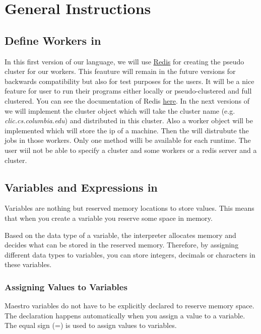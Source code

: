 \section{General Instructions}
\label{sect:general}

\subsection*{Define Workers in \lang{}}
In this first version of our \lang{} language, we will use \href{http://www.redis.io}{Redis}
for creating the pseudo cluster for our workers. This feauture will remain in the future versions for backwards compatibility but also for test purposes for the users.
It will be a nice feature for user to run their \lang{} programs either locally or pseudo-clustered and full clustered.
You can see the documentation of Redis \href{http://redis.io/documentation}{here}.
In the next versions of \lang{} we will implement the cluster object which will take the cluster name (e.g. \textit{clic.cs.columbia.edu}) and distributed in this cluster.
Also a worker object will be implemented which will store the ip of a machine. Then the \lang{} will distrubute the jobs in those workers.
Only one method willi be available for each runtime. The user wiil not be able to specify a cluster and some workers or a redis server and a cluster.

\subsection*{Variables and Expressions in \lang{}}
Variables are nothing but reserved memory locations to store values. This means that when you create a variable you reserve some space in memory.

Based on the data type of a variable, the interpreter allocates memory and decides what can be stored in the reserved memory. Therefore, by assigning different data types to variables, you can store integers, decimals or characters in these variables.

\subsubsection*{Assigning Values to Variables}

Maestro variables do not have to be explicitly declared to reserve memory space. The declaration happens automatically when you assign a value to a variable. The equal sign (=) is used to assign values to variables.

